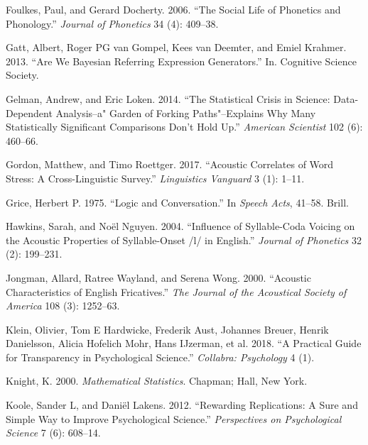 \documentclass[
  12pt,
]{article}
\newlength{\cslhangindent}
\newenvironment{CSLReferences}[2] %
 {%
  \setlength{\parindent}{0pt}
  \ifodd #1 \everypar{\setlength{\hangindent}{\cslhangindent}}\ignorespaces\fi
  \ifnum #2 > 0
  \setlength{\parskip}{#2\baselineskip}
  \fi
 }%
 {}
\begin{document}
\begin{CSLReferences}{1}{0}
\leavevmode{}%
Foulkes, Paul, and Gerard Docherty. 2006. {``The Social Life of Phonetics and Phonology.''} \emph{Journal of Phonetics} 34 (4): 409--38.

\leavevmode{}%
Gatt, Albert, Roger PG van Gompel, Kees van Deemter, and Emiel Krahmer. 2013. {``Are We Bayesian Referring Expression Generators.''} In. Cognitive Science Society.

\leavevmode{}%
Gelman, Andrew, and Eric Loken. 2014. {``The Statistical Crisis in Science: Data-Dependent Analysis--a" Garden of Forking Paths"--Explains Why Many Statistically Significant Comparisons Don't Hold Up.''} \emph{American Scientist} 102 (6): 460--66.

\leavevmode{}%
Gordon, Matthew, and Timo Roettger. 2017. {``Acoustic Correlates of Word Stress: A Cross-Linguistic Survey.''} \emph{Linguistics Vanguard} 3 (1): 1--11.

\leavevmode{}%
Grice, Herbert P. 1975. {``Logic and Conversation.''} In \emph{Speech Acts}, 41--58. Brill.

\leavevmode{}%
Hawkins, Sarah, and Noël Nguyen. 2004. {``Influence of Syllable-Coda Voicing on the Acoustic Properties of Syllable-Onset /l/ in {E}nglish.''} \emph{Journal of Phonetics} 32 (2): 199--231.

\leavevmode{}%
Jongman, Allard, Ratree Wayland, and Serena Wong. 2000. {``Acoustic Characteristics of English Fricatives.''} \emph{The Journal of the Acoustical Society of America} 108 (3): 1252--63.

\leavevmode{}%
Klein, Olivier, Tom E Hardwicke, Frederik Aust, Johannes Breuer, Henrik Danielsson, Alicia Hofelich Mohr, Hans IJzerman, et al. 2018. {``A Practical Guide for Transparency in Psychological Science.''} \emph{Collabra: Psychology} 4 (1).

\leavevmode{}%
Knight, K. 2000. \emph{Mathematical Statistics}. Chapman; Hall, New York.

\leavevmode{}%
Koole, Sander L, and Daniël Lakens. 2012. {``Rewarding Replications: A Sure and Simple Way to Improve Psychological Science.''} \emph{Perspectives on Psychological Science} 7 (6): 608--14.


\end{CSLReferences}
\end{document}
